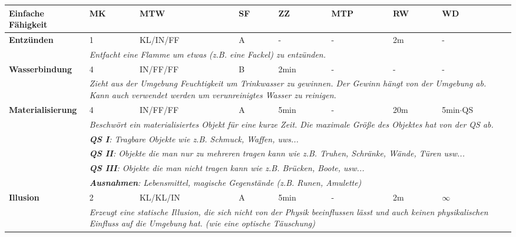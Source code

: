\begin{longtable}{|p{4cm}|p{0.8cm}|p{2.2cm}|p{0.8cm}|p{0.8cm}|p{2.2cm}|p{0.8cm}|p{2.5cm}|}
\hline
\textbf{Einfache Fähigkeit} & \textbf{MK} & \textbf{MTW} & \textbf{SF} & \textbf{ZZ} & \textbf{MTP} & \textbf{RW} & \textbf{WD} \\

\hline
\textbf{Entzünden} & 1 & KL/IN/FF & A & - & - & 2m & - \\ \hline
\multicolumn{1}{r}{} & \multicolumn{7}{|p{13cm}|}{\textit{Entfacht eine Flamme um etwas (z.B. eine Fackel) zu entzünden.}} \\

\hline
\textbf{Wasserbindung} & 4 & IN/FF/FF & B & 2min & - & - & - \\ \hline
\multicolumn{1}{r}{} & \multicolumn{7}{|p{13cm}|}{\textit{Zieht aus der Umgebung Feuchtigkeit um Trinkwasser zu gewinnen. Der Gewinn hängt von der Umgebung ab. Kann auch verwendet werden um verunreinigtes Wasser zu reinigen.}} \\

\hline
\textbf{Materialisierung} & 4 & IN/FF/FF & A & 5min & - & 20m & 5min$\cdot$QS \\ \hline
\multicolumn{1}{r}{} & \multicolumn{7}{|p{13cm}|}{\textit{Beschwört ein materialisiertes Objekt für eine kurze Zeit. Die maximale Größe des Objektes hat von der QS ab.}} \\
\multicolumn{1}{r}{} & \multicolumn{7}{|p{13cm}|}{\textit{\textbf{QS I}: Tragbare Objekte wie z.B. Schmuck, Waffen, uws...}} \\
\multicolumn{1}{r}{} & \multicolumn{7}{|p{13cm}|}{\textit{\textbf{QS II}: Objekte die man nur zu mehreren tragen kann wie z.B. Truhen, Schränke, Wände, Türen usw...}} \\
\multicolumn{1}{r}{} & \multicolumn{7}{|p{13cm}|}{\textit{\textbf{QS III}: Objekte die man nicht tragen kann wie z.B. Brücken, Boote, usw...}} \\
\multicolumn{1}{r}{} & \multicolumn{7}{|p{13cm}|}{\textit{\textbf{Ausnahmen}: Lebensmittel, magische Gegenstände (z.B. Runen, Amulette)}} \\

\hline
\textbf{Illusion} & 2 & KL/KL/IN & A & 5min & - & 2m & $\infty$ \\ \hline
\multicolumn{1}{r}{} & \multicolumn{7}{|p{13cm}|}{\textit{Erzeugt eine statische Illusion, die sich nicht von der Physik beeinflussen lässt und auch keinen physikalischen Einfluss auf die Umgebung hat. (wie eine optische Täuschung)}} \\


\end{longtable}
